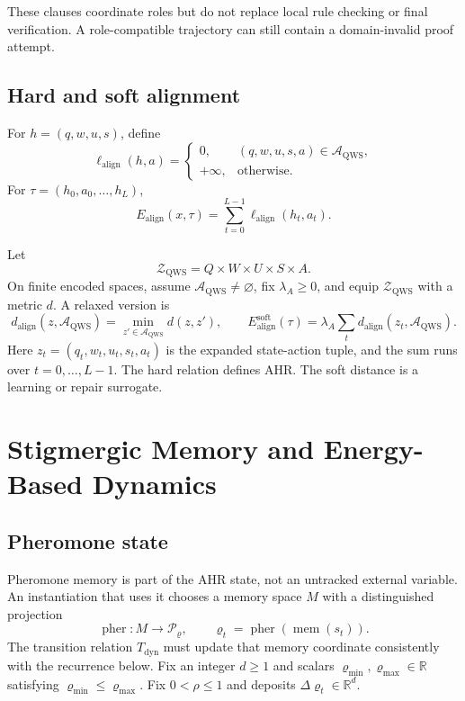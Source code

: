 \documentclass[11pt,oneside]{book}
\theoremstyle{remark}
\newcommand{\AQWS}{\mathcal A_{\mathrm{QWS}}}
\begin{document}
These clauses coordinate roles but do not replace local rule checking or final verification. A role-compatible trajectory can still contain a domain-invalid proof attempt.

\section{Hard and soft alignment}

For $h=(q,w,u,s)$, define
\[
\ell_{\mathrm{align}}(h,a)=
\begin{cases}
0,&(q,w,u,s,a)\in\AQWS,\\
+\infty,&\text{otherwise}.
\end{cases}
\]
For $\tau=(h_0,a_0,\ldots,h_L)$,
\[
E_{\mathrm{align}}(x,\tau)=\sum_{t=0}^{L-1}\ell_{\mathrm{align}}(h_t,a_t).
\]

Let
\[
\mathcal Z_{\mathrm{QWS}}=Q\times W\times U\times S\times A.
\]
On finite encoded spaces, assume $\AQWS\ne\varnothing$, fix
$\lambda_A\ge0$, and equip
$\mathcal Z_{\mathrm{QWS}}$ with a metric $d$. A relaxed version is
\[
d_{\mathrm{align}}(z,\AQWS)=\min_{z'\in\AQWS}d(z,z'),
\qquad
E_{\mathrm{align}}^{\mathrm{soft}}(\tau)
=\lambda_A\sum_t d_{\mathrm{align}}(z_t,\AQWS).
\]
Here $z_t=(q_t,w_t,u_t,s_t,a_t)$ is the expanded state-action tuple, and the
sum runs over $t=0,\ldots,L-1$.
The hard relation defines AHR. The soft distance is a learning or repair surrogate.

\chapter{Stigmergic Memory and Energy-Based Dynamics}

\section{Pheromone state}

Pheromone memory is part of the AHR state, not an untracked external variable.
An instantiation that uses it chooses a memory space $M$ with a distinguished
projection
\[
\operatorname{pher}:M\to\mathcal P_{\varrho},
\qquad
\varrho_t=\operatorname{pher}(\operatorname{mem}(s_t)).
\]
The transition relation $T_{\mathrm{dyn}}$ must update that memory coordinate
consistently with the recurrence below.
Fix an integer $d\ge1$ and scalars
$\varrho_{\min},\varrho_{\max}\in\mathbb R$ satisfying
$\varrho_{\min}\le\varrho_{\max}$. Fix $0<\rho\le1$ and deposits
$\Delta\varrho_t\in\mathbb R^d$.
\end{document}

